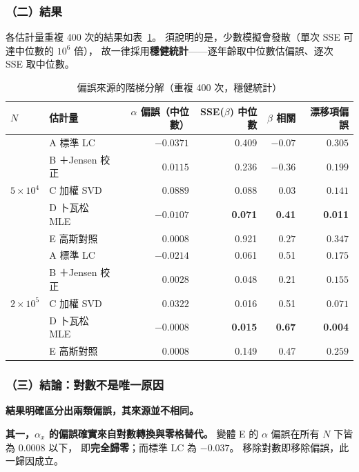 \documentclass[UTF8, fontset=macnew, a4paper, 12pt]{ctexart}
\begin{document}
\subsubsection{（二）結果}

各估計量重複 400 次的結果如表~\ref{tab:decomp}。
須說明的是，少數模擬會發散（單次 SSE 可達中位數的 $10^6$ 倍），
故一律採用\textbf{穩健統計}——逐年齡取中位數估偏誤、逐次 SSE 取中位數。

\begin{table}[H]
\centering
\caption{偏誤來源的階梯分解（重複 400 次，穩健統計）}
\small
\begin{tabular}{llrrrr}
\toprule
$N$ & 估計量 & $\alpha$ 偏誤（中位數） & SSE($\beta$) 中位數
 & $\beta$ 相關 & 漂移項偏誤\\
\midrule
\multirow{5}{*}{$5\times10^4$}
 & A 標準 LC        & $-0.0371$ & 0.409 & $-0.07$ & $0.305$\\
 & B ＋Jensen 校正  & $\phantom{-}0.0115$ & 0.236 & $-0.36$ & $0.199$\\
 & C 加權 SVD       & $\phantom{-}0.0889$ & 0.088 & $\phantom{-}0.03$ & $0.141$\\
 & D 卜瓦松 MLE     & $-0.0107$ & \textbf{0.071} & \textbf{0.41} & \textbf{0.011}\\
 & E 高斯對照       & $\phantom{-}\mathbf{0.0008}$ & 0.921 & $\phantom{-}0.27$ & $\mathbf{0.347}$\\
\midrule
\multirow{5}{*}{$2\times10^5$}
 & A 標準 LC        & $-0.0214$ & 0.061 & 0.51 & $0.175$\\
 & B ＋Jensen 校正  & $\phantom{-}0.0028$ & 0.048 & 0.21 & $0.155$\\
 & C 加權 SVD       & $\phantom{-}0.0322$ & 0.016 & 0.51 & $0.071$\\
 & D 卜瓦松 MLE     & $-0.0008$ & \textbf{0.015} & \textbf{0.67} & \textbf{0.004}\\
 & E 高斯對照       & $\phantom{-}\mathbf{0.0008}$ & 0.149 & 0.47 & $\mathbf{0.259}$\\
\bottomrule
\end{tabular}
\label{tab:decomp}
\end{table}

\subsubsection{（三）結論：對數不是唯一原因}

\textbf{結果明確區分出兩類偏誤，其來源並不相同。}

\textbf{其一，$\alpha_x$ 的偏誤確實來自對數轉換與零格替代。}
變體 E 的 $\alpha$ 偏誤在所有 $N$ 下皆為 $0.0008$ 以下，
即\textbf{完全歸零}；而標準 LC 為 $-0.037$。
移除對數即移除偏誤，此一歸因成立。
\end{document}
